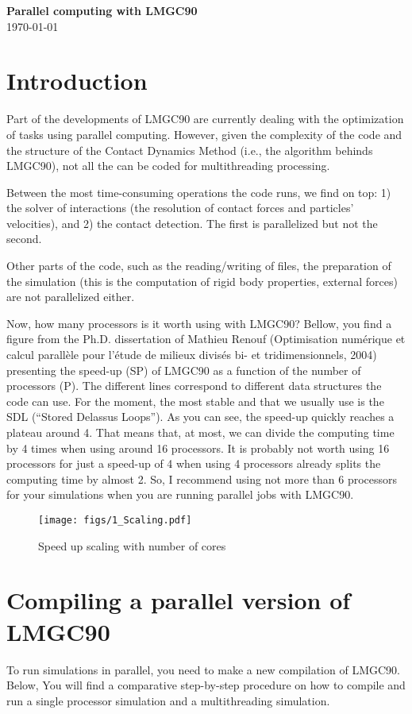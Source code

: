 \documentclass[12pt]{article}
\begin{document}
\thispagestyle{mypagestyle}

\begin{center}
  \textbf{\Large Parallel computing with LMGC90}\\
  \today
\end{center}

\section*{Introduction}
Part of the developments of LMGC90 are currently dealing with the optimization of tasks using parallel computing. However, given the complexity of the code and the structure of the Contact Dynamics Method (i.e., the algorithm behinds LMGC90), not all the can be coded for multithreading processing.

Between the most time-consuming operations the code runs, we find on top: 1) the solver of interactions (the resolution of contact forces and particles’ velocities), and 2) the contact detection. The first is parallelized but not the second.

Other parts of the code, such as the reading/writing of files, the preparation of the simulation (this is the computation of rigid body properties, external forces) are not parallelized either. 

Now, how many processors is it worth using with LMGC90? Bellow, you find a figure from the Ph.D. dissertation of Mathieu Renouf (Optimisation numérique et calcul parallèle pour l’étude de milieux divisés bi- et tridimensionnels, 2004) presenting the speed-up (SP) of LMGC90 as a function of the number of processors (P). 
The different lines correspond to different data structures the code can use. For the moment, the most stable and that we usually use is the SDL (“Stored Delassus Loops”). 
As you can see, the speed-up quickly reaches a plateau around 4. 
That means that, at most, we can divide the computing time by 4 times when using around 16 processors. It is probably not worth using 16 processors for just a speed-up of 4 when using 4 processors already splits the computing time by almost 2. 
So, I recommend using not more than 6 processors for your simulations when you are running parallel jobs with LMGC90. 

\begin{figure}
  \centering
  \texttt{[image: figs/1\_Scaling.pdf]}
  \caption{Speed up scaling with number of cores}
\end{figure}

\section*{Compiling a parallel version of LMGC90}
To run simulations in parallel, you need to make a new compilation of LMGC90. Below, You will find a comparative step-by-step procedure on how to compile and run a single processor simulation and a multithreading simulation. 
\end{document}
